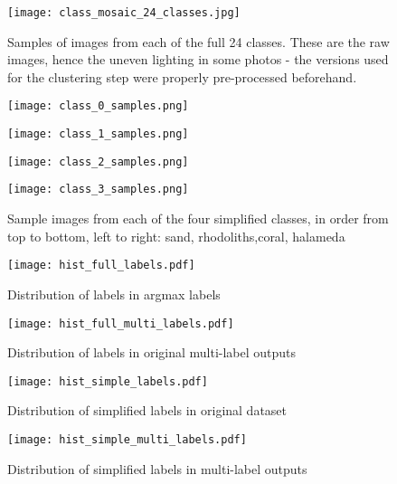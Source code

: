 \begin{figure}
    \texttt{[image: class\_mosaic\_24\_classes.jpg]}
    \caption{Samples of images from each of the full 24 classes. These are the raw images, hence the uneven lighting in some photos - the versions used for the clustering step were properly pre-processed beforehand.}
    \label{fig:24classes}
\end{figure}


\begin{figure}
    \begin{minipage}{.45\linewidth}
        \texttt{[image: class\_0\_samples.png]}
    \end{minipage}
    \hfill
    \begin{minipage}{.45\linewidth}
        \texttt{[image: class\_1\_samples.png]}
    \end{minipage}
    \vfill
    \begin{minipage}{.45\linewidth}
        \texttt{[image: class\_2\_samples.png]}
    \end{minipage}
    \hfill
    \begin{minipage}{.45\linewidth}
        \texttt{[image: class\_3\_samples.png]}
    \end{minipage}
    \caption{Sample images from each of the four simplified classes, in order from top to bottom, left to right: sand, rhodoliths,coral, halameda}
    \label{fig:4classes}
\end{figure}

\begin{figure}
    \begin{minipage}{.47\linewidth}
        \texttt{[image: hist\_full\_labels.pdf]}
        \caption{Distribution of labels in argmax labels}
        \label{fig:singlelabeldistr}
    \end{minipage}
    \hfill
    \begin{minipage}{.47\linewidth}
        \texttt{[image: hist\_full\_multi\_labels.pdf]}
        \caption{Distribution of labels in original multi-label outputs}
        \label{fig:multilabeldistr}
    \end{minipage}
    \begin{minipage}{.47\linewidth}
        \texttt{[image: hist\_simple\_labels.pdf]}
        \caption{Distribution of simplified labels in original dataset}
        \label{fig:singlelabeldistr}
    \end{minipage}
    \hfill
    \begin{minipage}{.47\linewidth}
        \texttt{[image: hist\_simple\_multi\_labels.pdf]}
        \caption{Distribution of simplified labels in multi-label outputs}
        \label{fig:multilabeldistr}
    \end{minipage}
\end{figure}

